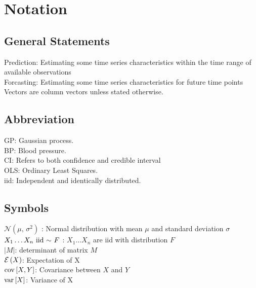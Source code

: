 \chapter*{Notation}
\label{c:Notation}


\section{General Statements}
Prediction: Estimating some time series characteristics
within the time range of available observations
\\
Forcasting: Estimating some time series characteristics for future time points \\
Vectors are column vectors unless stated otherwise.

\section{Abbreviation}\label{sec:abbreviation}
GP: Gaussian process. \\
BP: Blood pressure. \\
CI: Refers to both confidence and credible interval\\
OLS: Ordinary Least Squares. \\
iid: Independent and identically distributed.

\section{Symbols}\label{sec:symbols}
$\mathcal{N}(\mu,\,\sigma^{2})$ : Normal distribution with mean $\mu$ and standard deviation $\sigma$ \\
$X_1 \dots X_n \text{ iid }{\sim} \text{ } F$ : $X_1 \dots X_n$ are iid with distribution $F$ \\
$|M|$: determinant of matrix $M$ \\
$\ERW{X}$: Expectation of X \\
$\COV{X,Y}$: Covariance between $X$ and $Y$ \\
$\VAR{X}$: Variance of X


